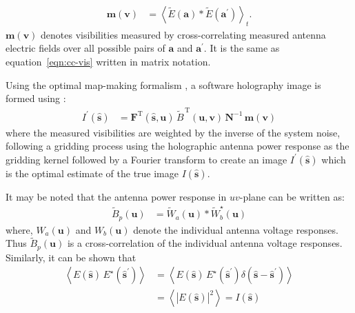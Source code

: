 \documentclass[a4paper,fleqn,usenatbib]{../mnras}
\begin{document}
\begin{align}
  \mathbf{m}(\mathbf{v}) &= \left\langle \widetilde{E}(\mathbf{a})\ast\widetilde{E}(\mathbf{a}^\prime)\right\rangle_t. \label{eqn:matrix-cc-vis}
\end{align}
$\mathbf{m}(\mathbf{v})$ denotes visibilities measured by cross-correlating measured antenna electric fields over all possible pairs of $\mathbf{a}$ and $\mathbf{a}^\prime$. It is the same as equation~\ref{eqn:cc-vis} written in matrix notation.

Using the optimal map-making formalism \citep{teg97a,teg97b}, a software holography image is formed using \citep{mor09}:
\begin{align}
  I^\prime(\hat{\mathbf{s}}) &= \mathbf{F}^\textrm{T}(\hat{\mathbf{s}},\mathbf{u})\,\widetilde{B}^{\,\textrm{T}}(\mathbf{u},\mathbf{v})\,\mathbf{N}^{-1}\,\mathbf{m}(\mathbf{v}) \label{eqn:dirty-image-FX}
\end{align}
where the measured visibilities are weighted by the inverse of the system noise, following a gridding process using the holographic antenna power response as the gridding kernel followed by a Fourier transform to create an image $I^\prime(\hat{\mathbf{s}})$ which is the optimal estimate of the true image $I(\hat{\mathbf{s}})$. 

It may be noted that the antenna power response in $uv$-plane can be written as:
\begin{align}\label{eqn:antenna-power-breakup}
  \tilde{B}_p(\mathbf{u}) &= \widetilde{W}_a(\mathbf{u}) \ast \widetilde{W}_b^\star(\mathbf{u})
\end{align}
where, $W_a(\mathbf{u})$ and $W_b(\mathbf{u})$ denote the individual antenna voltage responses. Thus $\tilde{B}_p(\mathbf{u})$ is a cross-correlation of the individual antenna voltage responses. Similarly, it can be shown that 
\begin{align}
  \left\langle E(\hat{\mathbf{s}})\,E^\star(\hat{\mathbf{s}}^\prime)\right\rangle &= \left\langle E(\hat{\mathbf{s}})\,E^\star(\hat{\mathbf{s}}^\prime) \delta(\hat{\mathbf{s}}-\hat{\mathbf{s}}^\prime) \right\rangle \nonumber\\
  &= \left\langle \left|E(\hat{\mathbf{s}})\right|^2 \right\rangle = I(\hat{\mathbf{s}}) \label{eqn:sky-intensity}
\end{align}
\end{document}
